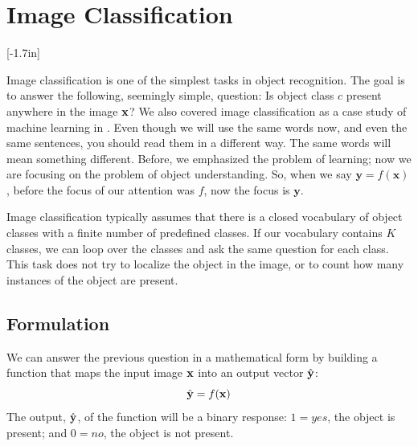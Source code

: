 \section{Image Classification}
\label{sec:image_classification}
[-1.7in]

Image classification is one of the simplest tasks in object recognition. The goal is to answer the following, seemingly simple, question: Is object class $c$ present anywhere in the image ${\bf x}$? We also covered image classification as a case study of machine learning in \sect{\ref{sec:intro_to_learning:image_classification}}. Even though we will use the same words now, and even the same sentences, you should read them in a different way. The same words will mean something different. Before, we emphasized the problem of learning; now we are focusing on the problem of object understanding. So, when we say $\mathbf{y} = f(\mathbf{x})$, before the focus of our attention was $f$, now the focus is $\mathbf{y}$. 





Image classification typically assumes that there is a closed vocabulary of object classes with a finite number of predefined classes. If our vocabulary contains $K$ classes, we can loop over the classes and ask the same question for each class. This task does not try to localize the object in the image, or to count how many instances of the object are present.
 
\subsection{Formulation}
We can answer the previous question in a mathematical form by building a function that maps the input image ${\bf x}$ into an output vector $\hat {\bf y}$:
\begin{equation}
\hat {\bf y} = f({\bf x})
\end{equation}
The output, $\hat {\bf y}$, of the function will be a binary response: $1=yes$, the object is present; and $0=no$, the object is not present. 

